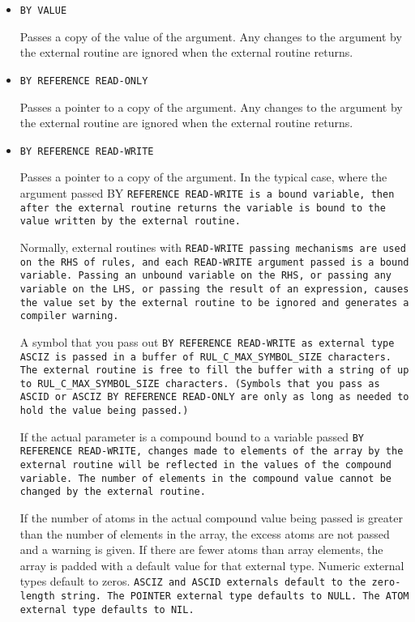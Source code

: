 \begin{itemize}
\item \tt{BY VALUE}

  Passes a copy of the value of the argument. Any changes to the
  argument by the external routine are ignored when the external
  routine returns.

\item \tt{BY REFERENCE READ-ONLY}

  Passes a pointer to a copy of the argument. Any changes to the
  argument by the external routine are ignored when the external
  routine returns.

\item \tt{BY REFERENCE READ-WRITE}

  Passes a pointer to a copy of the argument. In the typical case,
  where the argument passed BY \tt{REFERENCE READ-WRITE} is a bound
  variable, then after the external routine returns the variable is
  bound to the value written by the external routine.

  Normally, external routines with \tt{READ-WRITE} passing mechanisms
  are used on the RHS of rules, and each \tt{READ-WRITE} argument
  passed is a bound variable.  Passing an unbound variable on the RHS,
  or passing any variable on the LHS, or passing the result of an
  expression, causes the value set by the external routine to be
  ignored and generates a compiler warning.

  A symbol that you pass out \tt{BY REFERENCE READ-WRITE} as external
  type \tt{ASCIZ} is passed in a buffer of
  \verb|RUL_C_MAX_SYMBOL_SIZE| characters. The external routine is
  free to fill the buffer with a string of up to
  \verb|RUL_C_MAX_SYMBOL_SIZE| characters. (Symbols that you pass as
  \tt{ASCID} or \tt{ASCIZ BY REFERENCE READ-ONLY} are only as long as
  needed to hold the value being passed.)

  If the actual parameter is a compound bound to a variable passed
  \tt{BY REFERENCE READ-WRITE}, changes made to elements of the array
  by the external routine will be reflected in the values of the
  compound variable. The number of elements in the compound value
  cannot be changed by the external routine.

  If the number of atoms in the actual compound value being passed is
  greater than the number of elements in the array, the excess atoms
  are not passed and a warning is given. If there are fewer atoms than
  array elements, the array is padded with a default value for that
  external type. Numeric external types default to zeros. \tt{ASCIZ}
  and \tt{ASCID} externals default to the zero-length string. The
  \tt{POINTER} external type defaults to \tt{NULL}. The \tt{ATOM}
  external type defaults to \tt{NIL}.


\end{itemize}
